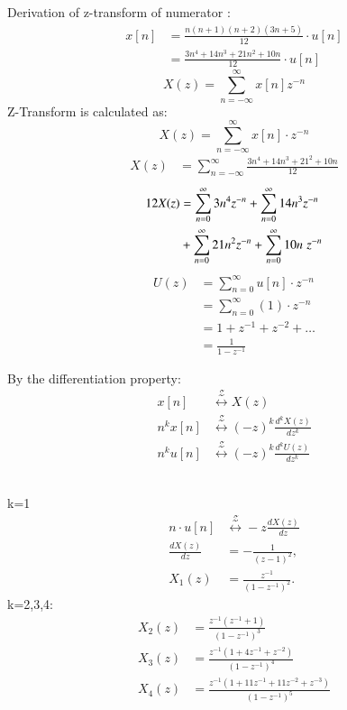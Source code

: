 \documentclass[journal,12pt,twocolumn]{IEEEtran}
\theoremstyle{remark}
\begin{document}
\begin{enumerate}[label=\alph*)]
Derivation of z-transform of numerator :
\begin{align}
    x[n] &= \frac{n(n+1)(n+2)(3n+5)}{12}\cdot u[n]\\
         &= \frac{3n^4 + 14n^3 + 21n^2 + 10n}{12}\cdot u[n]\
\end{align}
\begin{equation}
    X(z) = \sum_{n=-\infty}^\infty x[n]z^{-n}
\end{equation}
Z-Transform is calculated as:
\begin{equation}
    X(z) = \sum_{n=-\infty}^\infty x[n]\cdot z^{-n}
\end{equation}
\begin{align}
    X(z) &= \sum_{n=-\infty}^\infty\frac{3n^4 + 14n^3 + 21^2 + 10n}{12}
\end{align}
\begin{align}\label{eq:3}
    12X(z) &= \sum_{n=0}^\infty 3n^4z^{-n} +  \sum_{n=0}^\infty 14n^3z^{-n} \\ &+  \sum_{n=0}^\infty 21n^2 z^{-n} +\sum_{n=0}^\infty 10n\hspace{3pt} z^{-n}\notag
\end{align}
    \begin{align}
U(z) &= \sum_{n=0}^{\infty} u[n]\cdot z^{-n} \\
     &= \sum_{n=0}^{\infty} (1) \cdot z^{-n} \\
     &= 1 + z^{-1} + z^{-2} + \ldots \\
     &= \frac{1}{1 - z^{-1}} 
\end{align}

By the differentiation property:\\
\begin{align}
x[n] &\stackrel{\mathcal{Z}}{\longleftrightarrow} X(z)\\
n^k x[n] &\stackrel{\mathcal{Z}}{\longleftrightarrow} (-z)^k \frac{d^kX(z)}{dz^k}\\
n^k u[n] &\stackrel{\mathcal{Z}}{\longleftrightarrow} (-z)^k \frac{d^kU(z)}{dz^k} \label{eq:24}
\end{align}

\\

 k=1 
\begin{align}
    n \cdot u[n] &\stackrel{\mathcal{Z}}{\longleftrightarrow} -z \frac{dX(z)}{dz}\\
    \frac{dX(z)}{dz} &= -\frac{1}{(z - 1)^2}, \\
    X_1(z) &= \frac{z^{-1}}{(1-z^{-1})^2}.
\end{align}
 k=2,3,4:
\begin{align}
     X_2(z) &= \frac{z^{-1}(z^{-1}+1)}{(1-z^{-1})^3}\\
     X_3(z) &= \frac{z^{-1}(1+4z^{-1}+z^{-2})}{(1-z^{-1})^4}\\
    X_4(z) &= \frac{z^{-1}(1+11z^{-1}+11z^{-2}+z^{-3})}{(1-z^{-1})^5} 
\end{align}


\end{enumerate}
\end{document}
